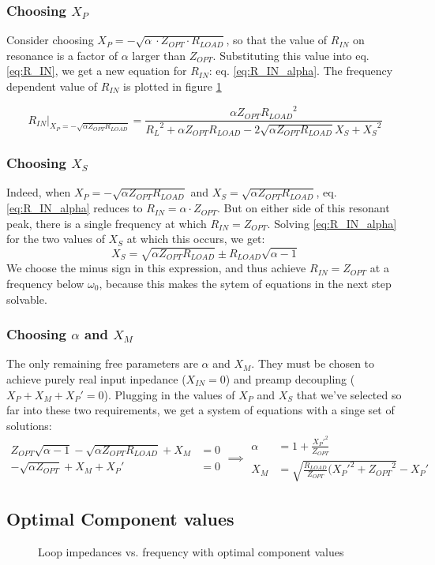 \subsubsection{Choosing $X_P$}
Consider choosing $X_P=-\sqrt{\alpha\ \cdot Z_{OPT} \cdot R_{LOAD}}$, so that the value of $R_{IN}$ on resonance is a
factor of $\alpha$ larger than $Z_{OPT}$. Substituting this value into eq. \ref{eq:R_IN}, we get a new equation for
$R_{IN}$: eq. \ref{eq:R_IN_alpha}. The frequency dependent value of $R_{IN}$ is plotted in figure
\ref{fig:impedance_plot}

\begin{equation} \label{eq:R_IN_alpha}
    R_{IN}\big|_{X_P=-\sqrt{\alpha Z_{OPT} R_{LOAD}}} = \frac{\alpha Z_{OPT} {R_{LOAD}}^2}{{R_L}^2 + \alpha Z_{OPT} R_{LOAD} - 2\sqrt{\alpha Z_{OPT} R_{LOAD}} X_S + {X_S}^2}
\end{equation}

\subsubsection{Choosing $X_S$}
Indeed, when $X_P=-\sqrt{\alpha Z_{OPT} R_{LOAD}}$ and $X_S=\sqrt{\alpha Z_{OPT} R_{LOAD}}$, eq.  \ref{eq:R_IN_alpha}
reduces to $R_{IN} = \alpha \cdot Z_{OPT}$.  But on either side of this resonant peak, there is a single frequency at
which $R_{IN} = Z_{OPT}$. Solving \ref{eq:R_IN_alpha} for the two values of $X_S$ at which this occurs, we get: $$X_S =
\sqrt{\alpha Z_{OPT} R_{LOAD}} \pm R_{LOAD} \sqrt{\alpha - 1}$$ We choose the minus sign in this expression, and thus
achieve $R_{IN} = Z_{OPT}$ at a frequency below $\omega_0$, because this makes the sytem of equations in the next step
solvable.

\subsubsection{Choosing $\alpha$ and $X_M$}
The only remaining free parameters are $\alpha$ and $X_M$.  They must be chosen to achieve purely real input inpedance
($X_{IN} = 0$) and preamp decoupling ($X_P + X_M +{X_P}' = 0$). Plugging in the values of $X_P$ and $X_S$ that we've
selected so far into these two requirements, we get a system of equations with a singe set of solutions:
$$
\begin{aligned}
    Z_{OPT} \sqrt{\alpha - 1} - \sqrt{\alpha Z_{OPT} R_{LOAD}} + X_M &= 0\\
    -\sqrt{\alpha Z_{OPT}} + X_M + {X_P}' &= 0
\end{aligned}
\implies
\begin{aligned}
    \alpha &= 1 + \frac{{X_P}'^2}{Z_{OPT}}\\
    X_M &= \sqrt{\frac{R_{LOAD}}{Z_{OPT}} ({X_P}'^2 + {Z_{OPT}}^2} - {X_P}'
\end{aligned}
$$

\subsection{Optimal Component values}



\begin{figure}
    \centering
    
    \caption{Loop impedances vs. frequency with optimal component values}
    \label{fig:impedance_plot}
\end{figure}
